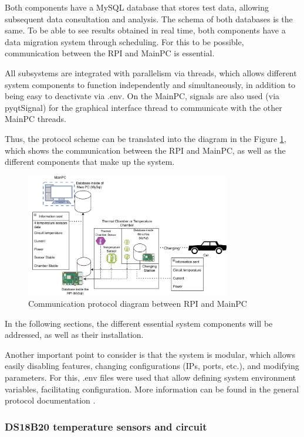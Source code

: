 Both components have a MySQL database that stores test data, allowing subsequent data consultation and analysis. The schema of both databases is the same. To be able to see results obtained in real time, both components have a data migration system through scheduling. For this to be possible, communication between the RPI and MainPC is essential.

All subsystems are integrated with parallelism via threads, which allows different system components to function independently and simultaneously, in addition to being easy to deactivate via .env. On the MainPC, signals are also used (via pyqtSignal) for the graphical interface thread to communicate with the other MainPC threads. 

Thus, the protocol scheme can be translated into the diagram in the Figure \ref{fig:diagrama_protocolo}, which shows the communication between the RPI and MainPC, as well as the different components that make up the system.
\begin{figure}[H]
    \centering
    \includegraphics[width=0.8\textwidth]{figures/protocol_diagram.png}
    \caption{Communication protocol diagram between RPI and MainPC}
    \label{fig:diagrama_protocolo}
\end{figure}

In the following sections, the different essential system components will be addressed, as well as their installation.

Another important point to consider is that the system is modular, which allows easily disabling features, changing configurations (IPs, ports, etc.), and modifying parameters. For this, .env files were used that allow defining system environment variables, facilitating configuration. More information can be found in the general protocol documentation \cite{Documentation_drive_folder}.

\subsubsection{DS18B20 temperature sensors and circuit}

